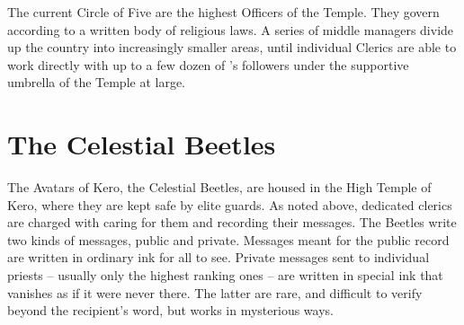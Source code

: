 \documentclass[blue]{GL2020}
\begin{document}
The current Circle of Five are the highest Officers of the Temple. They govern according to a written body of religious laws. A series of middle managers divide up the country into increasingly smaller areas, until individual Clerics are able to work directly with up to a few dozen of \cTechGod{}'s followers under the supportive umbrella of the Temple at large.

\section*{The Celestial Beetles}
The Avatars of Kero, the Celestial Beetles, are housed in the High Temple of Kero, where they are kept safe by elite guards. As noted above, dedicated clerics are charged with caring for them and recording their messages. The Beetles write two kinds of messages, public and private. Messages meant for the public record are written in ordinary ink for all to see. Private messages sent to individual priests – usually only the highest ranking ones – are written in special ink that vanishes as if it were never there. The latter are rare, and difficult to verify beyond the recipient’s word, but \cTechGod{} works in mysterious ways.
\end{document}
